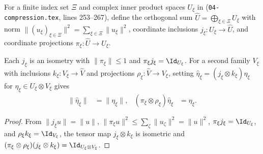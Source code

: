 \begin{definition}
    \label{def:peps_common_halfspaces}
    \leanok
    For a finite index set $\Xi$ and complex inner product spaces $U_\xi$ in
    \cite[proof of Theorem~5.2]{OpenAI2026PolynomialPEPS}
    (\texttt{04-compression.tex}, lines 253--267), define the orthogonal sum
    $\widehat U=\bigoplus_{\xi\in\Xi}U_\xi$ with norm
    $\|(u_\xi)_{\xi\in\Xi}\|^2=\sum_{\xi\in\Xi}\|u_\xi\|^2$, coordinate
    inclusions $j_\xi:U_\xi\to\widehat U$, and coordinate projections
    $\pi_\xi:\widehat U\to U_\xi$.
\end{definition}

\begin{lemma}
    \label{thm:peps_common_pair_source}
    \leanok
    Each $j_\xi$ is an isometry with $\|\pi_\xi\|\le1$ and
    $\pi_\xi j_\xi=\Id_{U_\xi}$. For a second family $V_\xi$ with inclusions
    $k_\xi:V_\xi\to\widehat V$ and projections $\rho_\xi:\widehat V\to V_\xi$,
    setting $\widehat\eta_\xi=(j_\xi\otimes k_\xi)\eta_\xi$ for
    $\eta_\xi\in U_\xi\otimes V_\xi$ gives
    \begin{align}
        \|\widehat\eta_\xi\|                     & =\|\eta_\xi\|, &
        (\pi_\xi\otimes\rho_\xi)\widehat\eta_\xi & =\eta_\xi.
        \label{eq:peps_common_pair_recovery}
    \end{align}
\end{lemma}

\begin{proof}\leanok
    From $\|j_\xi u\|=\|u\|$, $\|\pi_\xi u\|^2\le\sum_{\zeta}\|u_\zeta\|^2=\|u\|^2$,
    $\pi_\xi j_\xi=\Id_{U_\xi}$, and $\rho_\xi k_\xi=\Id_{V_\xi}$, the tensor
    map $j_\xi\otimes k_\xi$ is isometric and
    $(\pi_\xi\otimes\rho_\xi)(j_\xi\otimes k_\xi)=\Id_{U_\xi\otimes V_\xi}$.
\end{proof}

